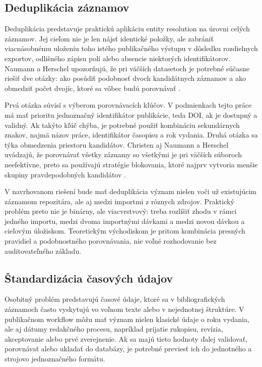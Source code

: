 \subsection{Deduplikácia záznamov}

Deduplikácia predstavuje praktickú aplikáciu entity resolution na úrovni celých záznamov. Jej cieľom nie je len nájsť identické položky, ale zabrániť viacnásobnému uloženiu toho istého publikačného výstupu v dôsledku rozdielnych exportov, odlišného zápisu polí alebo absencie niektorých identifikátorov. Naumann a Herschel upozorňujú, že pri väčších datasetoch je potrebné súčasne riešiť dve otázky: ako posúdiť podobnosť dvoch kandidátnych záznamov a ako obmedziť počet dvojíc, ktoré sa vôbec budú porovnávať \cite{NaumannHerschel2010}.

Prvá otázka súvisí s výberom porovnávacích kľúčov. V podmienkach tejto práce má mať prioritu jednoznačný identifikátor publikácie, teda DOI, ak je dostupný a validný. Ak takýto kľúč chýba, je potrebné použiť kombináciu sekundárnych znakov, najmä názov práce, identifikátor časopisu a rok vydania. Druhá otázka sa týka obmedzenia priestoru kandidátov. Christen aj Naumann a Herschel uvádzajú, že porovnávať všetky záznamy so všetkými je pri väčších súboroch neefektívne, preto sa používajú stratégie blokovania, ktoré najprv vytvoria menšie skupiny pravdepodobných kandidátov \cite{Christen2012,NaumannHerschel2010}.

V navrhovanom riešení bude mať deduplikácia význam nielen voči už existujúcim záznamom repozitára, ale aj medzi importmi z rôznych zdrojov. Praktický problém preto nie je binárny, ale viacvrstvový: treba rozlíšiť zhodu v rámci jedného importu, medzi dvoma importnými dávkami a medzi novou dávkou a cieľovým úložiskom. Teoretickým východiskom je pritom kombinácia presných pravidiel a podobnostného porovnávania, nie voľné rozhodovanie bez auditovateľného základu.

\subsection{Štandardizácia časových údajov}

Osobitný problém predstavujú časové údaje, ktoré sa v bibliografických záznamoch často vyskytujú vo voľnom texte alebo v nejednotnej štruktúre. V publikačnom workflow môžu mať význam nielen klasické údaje o roku vydania, ale aj dátumy redakčného procesu, napríklad prijatie rukopisu, revízia, akceptovanie alebo prvé zverejnenie. Ak sa majú tieto hodnoty ďalej validovať, porovnávať alebo ukladať do databázy, je potrebné previesť ich do jednotného a strojovo jednoznačného formátu.

